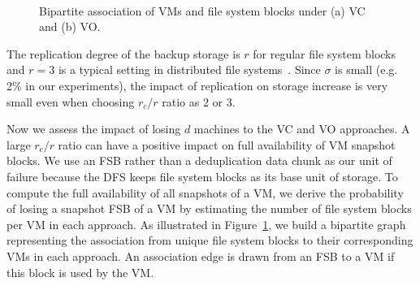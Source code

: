 \begin{figure}
    \centering
    \\
    \caption{Bipartite association of VMs and file system blocks under (a) VC and (b) VO. }
    \label{fig:share}
\end{figure}

The replication degree of the backup storage 
is $r$ for regular file system blocks and $r=3$ is a typical setting in distributed
file systems~\cite{googlefs03,hdfs10}.
Since $\sigma$ is small (e.g.  2\% in our experiments),  
the impact of replication on storage increase is very small even 
when choosing  $r_c/r$ ratio as 2 or 3. 



Now we  assess  the impact of losing $d$ machines 
to the VC and VO approaches.  
A large $r_c/r$ ratio can have a positive impact on full availability of VM snapshot blocks.
We use an FSB rather than a deduplication
data chunk as our unit of failure because the DFS keeps
file system blocks as its base unit of storage.
To compute the full availability of all snapshots of a VM, we derive
the probability of losing a snapshot FSB of a VM by
estimating the number of file system blocks per VM in each approach.
As illustrated in Figure~\ref{fig:share},
we build a bipartite graph representing the association from unique file system blocks
to their corresponding VMs in each approach. An association edge is  drawn  from an FSB to a VM 
if this block is used by the VM. 

